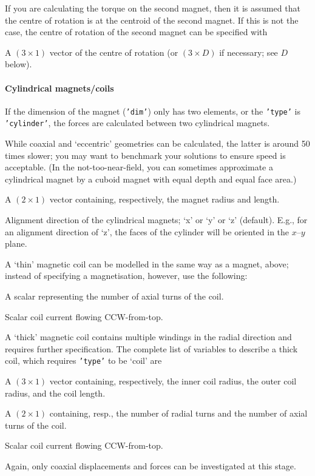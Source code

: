 \documentclass{article}
\begin{document}
If you are calculating the torque on the second magnet, then it is assumed that the centre of rotation is at the centroid of the second magnet.
If this is not the case, the centre of rotation of the second magnet can be specified with
\begin{description}[noitemsep,font=\ttfamily]
\item['lever'] A $(3\times1)$ vector of the centre of rotation
(or $(3\times D)$ if necessary; see $D$ below).
\end{description}

\paragraph{Cylindrical magnets/coils}
If the dimension of the magnet (\texttt{'dim'}) only has two elements,
or the \texttt{'type'} is \texttt{'cylinder'}, the forces are calculated between two cylindrical magnets.

While coaxial and `eccentric' geometries can be calculated, the latter is around 50 times slower; you may want to benchmark your solutions to ensure speed is acceptable. (In the not-too-near-field, you can sometimes approximate a cylindrical magnet by a cuboid magnet with equal depth and equal face area.)
\begin{description}[noitemsep,font=\ttfamily]
\item['dim'] A $(2\times1)$ vector containing, respectively, the magnet radius and length.
\item['dir'] Alignment direction of the cylindrical magnets;
`\textsf{x}' or `\textsf{y}' or `\textsf{z}' (default).
E.g., for an alignment direction of `\textsf{z}', the faces of the cylinder will be oriented in the $x$--$y$ plane.
\end{description}
A `thin' magnetic coil can be modelled in the same way as a magnet, above; instead of
specifying a magnetisation, however, use the following:
\begin{description}[noitemsep,font=\ttfamily]
\item['turns'] A scalar representing the number of axial turns of the coil.
\item['current'] Scalar coil current flowing CCW-from-top.
\end{description}

A `thick' magnetic coil contains multiple windings in the radial direction and requires further specification.
The complete list of variables to describe a thick coil, which requires \texttt{'type'} to be `\textsf{coil}' are
\begin{description}[noitemsep,font=\ttfamily]
\item['dim'] A $(3\times1)$ vector containing, respectively, the inner coil radius, the outer coil radius, and the coil length.
\item['turns'] A $(2\times1)$ containing, resp., the number of radial turns and the number of axial turns of the coil.
\item['current'] Scalar coil current flowing CCW-from-top.
\end{description}
Again, only coaxial displacements and forces can be investigated at this stage.
\end{document}
